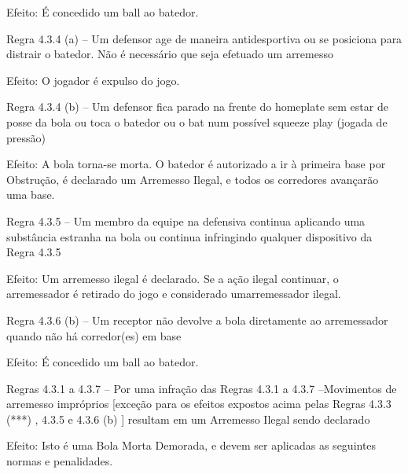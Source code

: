  Efeito: É concedido um \gls{ball} ao batedor.

 Regra 4.3.4 (a) -- Um defensor age de maneira antidesportiva ou se posiciona para distrair o batedor. Não é necessário que seja efetuado um arremesso

 Efeito: O jogador é expulso do jogo.

 Regra 4.3.4 (b) -- Um defensor fica parado na frente do \gls{homeplate} sem estar de posse da bola ou toca o batedor ou o \gls{bat} num possível \gls{squeeze play} (jogada de pressão)

 Efeito: A bola torna-se morta. O batedor é autorizado a ir à primeira base por Obstrução, é declarado um Arremesso Ilegal, e todos os corredores avançarão uma base.

 Regra 4.3.5 -- Um membro da equipe na defensiva continua aplicando uma substância estranha na bola ou continua infringindo qualquer dispositivo da  Regra 4.3.5

 Efeito: Um arremesso ilegal é declarado. Se a ação ilegal continuar, o arremessador é retirado do jogo e considerado umarremessador ilegal.

 Regra 4.3.6 (b) -- Um receptor não devolve a bola diretamente ao arremessador quando não há corredor(es) em base

 Efeito: É concedido um \gls{ball} ao batedor.

 Regras 4.3.1 a 4.3.7 -- Por uma infração das Regras 4.3.1 a 4.3.7 --Movimentos de arremesso impróprios [exceção para os efeitos expostos acima pelas
 Regras 4.3.3 (***)  , 4.3.5 e 4.3.6 (b) ] resultam em um Arremesso Ilegal sendo declarado

Efeito: Isto é uma Bola Morta Demorada, e devem ser aplicadas as seguintes normas e penalidades.

